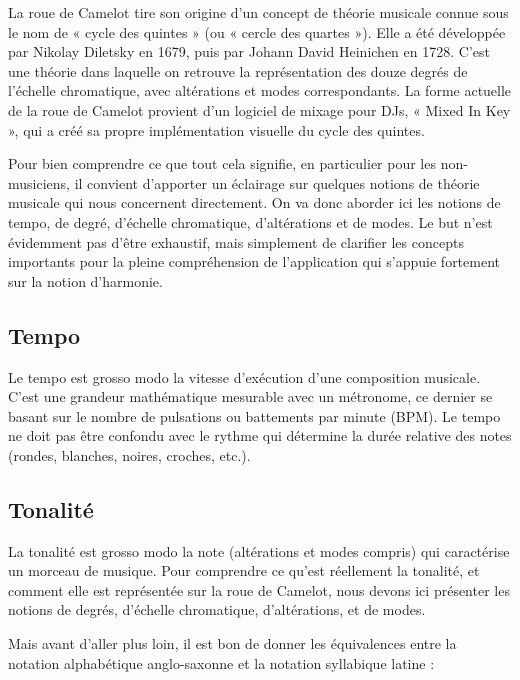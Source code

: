 \documentclass[a4paper,12pt]{article}
\begin{document}
\newpage

La roue de Camelot tire son origine d'un concept de théorie musicale connue sous le nom de « cycle des quintes » (ou « cercle des quartes »). Elle a été développée par Nikolay Diletsky en 1679, puis par Johann David Heinichen en 1728. C'est une théorie dans laquelle on retrouve la représentation des douze degrés de l'échelle chromatique, avec altérations et modes correspondants. La forme actuelle de la roue de Camelot provient d'un logiciel de mixage pour DJs, « Mixed In Key », qui a créé sa propre implémentation visuelle du cycle des quintes.

Pour bien comprendre ce que tout cela signifie, en particulier pour les non-musiciens, il convient d'apporter un éclairage sur quelques notions de théorie musicale qui nous concernent directement. On va donc aborder ici les notions de tempo, de degré, d'échelle chromatique, d'altérations et de modes. Le but n'est évidemment pas d'être exhaustif, mais simplement de clarifier les concepts importants pour la pleine compréhension de l'application qui s'appuie fortement sur la notion d'harmonie.

\subsection{Tempo}

Le tempo est grosso modo la vitesse d'exécution d'une composition musicale. C'est une grandeur mathématique mesurable avec un métronome, ce dernier se basant sur le nombre de pulsations ou battements par minute (BPM). Le tempo ne doit pas être confondu avec le rythme qui détermine la durée relative des notes (rondes, blanches, noires, croches, etc.).

\subsection{Tonalité}

La tonalité est grosso modo la note (altérations et modes compris) qui caractérise un morceau de musique. Pour comprendre ce qu'est réellement la tonalité, et comment elle est représentée sur la roue de Camelot, nous devons ici présenter les notions de degrés, d'échelle chromatique, d'altérations, et de modes.

Mais avant d'aller plus loin, il est bon de donner les équivalences entre la notation alphabétique anglo-saxonne et la notation syllabique latine :
\end{document}
